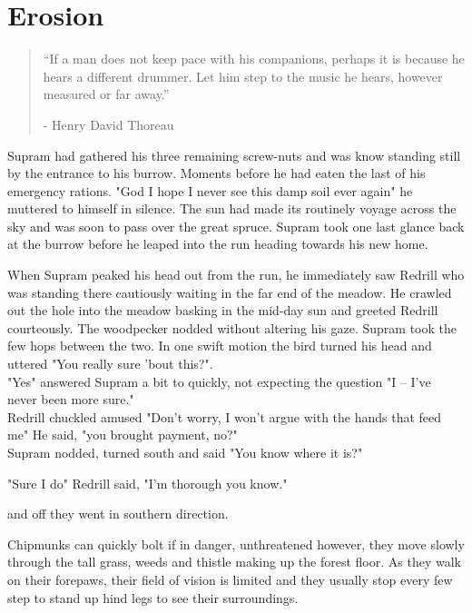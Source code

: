 \documentclass[smalldemyvopaper,11pt,twoside,onecolumn,openright,extrafontsizes]{memoir}
\begin{document}
\chapter{Erosion}

\vspace{-1.3cm}
\begin{localsize}{10}
	\begin{quote}
		“If a man does not keep pace with his companions, perhaps it is because he hears a different drummer. Let him step to the music he hears, however measured or far away.”
		\begin{flushright}- Henry David Thoreau \end{flushright}
	\end{quote} 
\end{localsize}
\vspace{1cm}


Supram had gathered his three remaining screw-nuts and was know standing still by the entrance to his burrow. Moments before he had eaten the last of his 
emergency rations. "God I hope I never see this damp soil ever again" he muttered to himself in silence. The sun had made its routinely voyage across the sky and was soon to pass over the great spruce. Supram took one last glance back at the burrow before he leaped into the run heading towards his new home. 

When Supram peaked his head out from the run, he immediately saw Redrill who was standing there cautiously waiting in the far end of the meadow. He crawled out the hole into the meadow basking in the mid-day sun and greeted Redrill courteously. The woodpecker nodded without altering his gaze. Supram took the few hops between the two. In one swift motion the bird turned his head and uttered "You really sure 'bout this?".\\

"Yes" answered Supram a bit to quickly, not expecting the question "I -- I've never been more sure."\\

Redrill chuckled amused "Don't worry, I won't argue with the hands that feed me" He said, "you brought payment, no?"\\

Supram nodded, turned south and said "You know where it is?"

"Sure I do" Redrill said, "I'm thorough you know."

and off they went in southern direction.

Chipmunks can quickly bolt if in danger, unthreatened however, they move slowly through the tall grass, weeds and thistle making up the forest floor. As they walk on their forepaws, their field of vision is limited and they usually stop every few step to stand up hind legs to see their surroundings.
\end{document}
